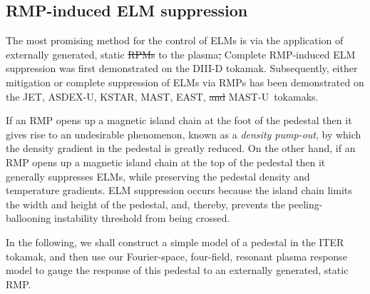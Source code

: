 \documentclass[12pt,prb,aps]{revtex4-1}
\providecommand{\DIFadd}[1]{{\protect\color{blue}\uwave{#1}}} %
\providecommand{\DIFdel}[1]{{\protect\color{red}\sout{#1}}}                      %
\providecommand{\DIFaddbegin}{} %
\providecommand{\DIFaddend}{} %
\providecommand{\DIFdelbegin}{} %
\providecommand{\DIFdelend}{} %
\begin{document}
\subsection{RMP-induced ELM suppression} 
The most promising method for the control of ELMs is via the
application of externally generated, static \DIFdelbegin \DIFdel{RPMs }\DIFdelend \DIFaddbegin \DIFadd{RMPs }\DIFaddend to the plasma\DIFdelbegin \DIFdel{, 
}\DIFdelend \DIFaddbegin \DIFadd{. 
}\DIFaddend Complete RMP-induced ELM suppression was first demonstrated on
the DIII-D tokamak.\cite{elmx} Subsequently, either mitigation or complete suppression of ELMs via RMPs has been demonstrated on the JET,\cite{rmp2} 
ASDEX-U,\cite{rmp3} 
KSTAR,\cite{rmp4} MAST, \cite{rmp5} EAST, \cite{rmp6}  \DIFdelbegin \DIFdel{and }\DIFdelend MAST-U\,\cite{rmp7} tokamaks\DIFaddbegin \DIFadd{, and on other devices}\DIFaddend . 

If an RMP opens up a magnetic island chain at the foot of the pedestal then it gives rise to an undesirable  phenomenon, known as a
{\em density pump-out}, by which the density gradient in the pedestal  is greatly reduced.\cite{hu,hu1,hu2} On the other hand,
if an RMP opens up a magnetic island chain at the top of the pedestal then it generally suppresses ELMs,  while preserving the pedestal density and temperature 
gradients.\cite{hu,hu1,hu2,hu3,hu4}
ELM suppression occurs because the
island chain limits the width and height of the pedestal, and, thereby, prevents the peeling-ballooning instability threshold from being crossed.\cite{pb}

In the following, we shall construct a simple model of a pedestal in the ITER tokamak, and then use our Fourier-space, four-field, resonant plasma 
response model to gauge the response of this  pedestal to an  externally generated, static RMP.
\end{document}
